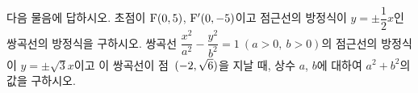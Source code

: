 다음 물음에 답하시오.
 초점이 $\mathrm{F}(0{,}\mkern3mu\mathopen{}5)$, $\mathrm{F}'(0{,}\mkern3mu\mathopen{}-5)$이고 점근선의 방정식이 $y=\pm\dfrac{1}{2}x$인 쌍곡선의 방정식을 구하시오.
 쌍곡선 $\dfrac{x^2}{a^2}-\dfrac{y^2}{b^2}=1\ (a>0,\ b>0)$의 점근선의 방정식이 $y=\pm\sqrt{3}x$이고 이 쌍곡선이 점~$(-2{,}\mkern3mu\mathopen{}\sqrt{6})$을 지날 때, 상수 $a$, $b$에 대하여 $a^2+b^2$의 값을 구하시오.

